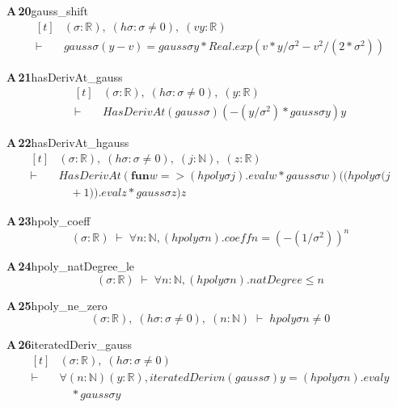 \documentclass[conference]{IEEEtran}
\theoremstyle{definition}
\newcommand{\lean}[1]{\textsf{\footnotesize #1}}
\begin{document}
\noindent\textbf{A\,20}\quad\lean{gauss\_shift}
{\footnotesize\[ \begin{aligned}[t]
&(\sigma : \mathbb{R} ),\; (\mathit{hσ} : \sigma \neq 0),\; (\mathit{v} \mathit{y} : \mathbb{R} )\\
\vdash\;&\mathit{gauss} \sigma (\mathit{y} - \mathit{v}) = \mathit{gauss} \sigma \mathit{y} * \mathit{Real}.\mathit{exp} (\mathit{v} * \mathit{y} / \sigma ^{2} - \mathit{v} ^{2} / (2 * \sigma ^{2}))
\end{aligned} \]}

\noindent\textbf{A\,21}\quad\lean{hasDerivAt\_gauss}
{\footnotesize\[ \begin{aligned}[t]
&(\sigma : \mathbb{R} ),\; (\mathit{hσ} : \sigma \neq 0),\; (\mathit{y} : \mathbb{R} )\\
\vdash\;&\mathit{HasDerivAt} (\mathit{gauss} \sigma ) (-(\mathit{y} / \sigma ^{2}) * \mathit{gauss} \sigma \mathit{y}) \mathit{y}
\end{aligned} \]}

\noindent\textbf{A\,22}\quad\lean{hasDerivAt\_hgauss}
{\footnotesize\[ \begin{aligned}[t]
&(\sigma : \mathbb{R} ),\; (\mathit{hσ} : \sigma \neq 0),\; (\mathit{j} : \mathbb{N} ),\; (\mathit{z} : \mathbb{R} )\\
\vdash\;&\mathit{HasDerivAt} (\mathbf{fun} \mathit{w} => (\mathit{hpoly} \sigma \mathit{j}).\mathit{eval} \mathit{w} * \mathit{gauss} \sigma \mathit{w}) ((\mathit{hpoly} \sigma (\mathit{j}\\
&\quad + 1)).\mathit{eval} \mathit{z} * \mathit{gauss} \sigma \mathit{z}) \mathit{z}
\end{aligned} \]}

\noindent\textbf{A\,23}\quad\lean{hpoly\_coeff}
{\footnotesize\[ (\sigma : \mathbb{R} ) \;\vdash\; \forall \mathit{n} : \mathbb{N} , (\mathit{hpoly} \sigma \mathit{n}).\mathit{coeff} \mathit{n} = (-(1 / \sigma ^{2})) ^{\mathit{n}} \]}

\noindent\textbf{A\,24}\quad\lean{hpoly\_natDegree\_le}
{\footnotesize\[ (\sigma : \mathbb{R} ) \;\vdash\; \forall \mathit{n} : \mathbb{N} , (\mathit{hpoly} \sigma \mathit{n}).\mathit{natDegree} \leq \mathit{n} \]}

\noindent\textbf{A\,25}\quad\lean{hpoly\_ne\_zero}
{\footnotesize\[ (\sigma : \mathbb{R} ),\; (\mathit{hσ} : \sigma \neq 0),\; (\mathit{n} : \mathbb{N} ) \;\vdash\; \mathit{hpoly} \sigma \mathit{n} \neq 0 \]}

\noindent\textbf{A\,26}\quad\lean{iteratedDeriv\_gauss}
{\footnotesize\[ \begin{aligned}[t]
&(\sigma : \mathbb{R} ),\; (\mathit{hσ} : \sigma \neq 0)\\
\vdash\;&\forall (\mathit{n} : \mathbb{N} ) (\mathit{y} : \mathbb{R} ), \mathit{iteratedDeriv} \mathit{n} (\mathit{gauss} \sigma ) \mathit{y} = (\mathit{hpoly} \sigma \mathit{n}).\mathit{eval} \mathit{y}\\
&\quad * \mathit{gauss} \sigma \mathit{y}
\end{aligned} \]}
\end{document}
